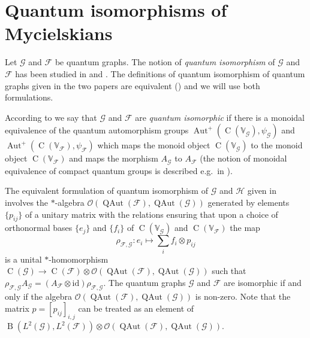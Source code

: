 \documentclass[11pt,reqno]{amsart}
\newcommand{\id}{\mathrm{id}}
\newcommand{\tens}{\otimes}
\DeclareMathOperator{\Aut}{Aut}
\DeclareMathOperator{\QAut}{QAut}
\DeclareMathOperator{\B}{B}
\DeclareMathOperator{\C}{C}
\begin{document}
\section{Quantum isomorphisms of Mycielskians}\label{sec:iso}

Let $\mathcal{G}$ and $\mathcal{F}$ be quantum graphs. The notion of \emph{quantum isomorphism} of $\mathcal{G}$ and $\mathcal{F}$ has been studied in \cite[Definition 4.4, Corollary 4.8]{Brannan_2019} and \cite[Definition 6.5, Theorem 6.6]{BEV}. The definitions of quantum isomorphism of quantum graphs given in the two papers are equivalent (\cite[Theorem 6.6]{BEV}) and we will use both formulations.

According to \cite[Definition 6.5]{BEV} we say that $\mathcal{G}$ and $\mathcal{F}$ are \emph{quantum isomorphic} if there is a monoidal equivalence of the quantum automorphism groups $\Aut^+(\C(\mathbb{V}_{\scriptscriptstyle\mathcal{G}}),\psi_{\scriptscriptstyle\mathcal{G}})$ and $\Aut^+(\C(\mathbb{V}_{\scriptscriptstyle\mathcal{F}}),\psi_{\scriptscriptstyle\mathcal{F}})$ which maps the monoid object $\C(\mathbb{V}_{\scriptscriptstyle\mathcal{G}})$ to the monoid object $\C(\mathbb{V}_{\scriptscriptstyle\mathcal{F}})$ and maps the morphism $A_{\scriptscriptstyle\mathcal{G}}$ to $A_{\scriptscriptstyle\mathcal{F}}$ (the notion of monoidal equivalence of compact quantum groups is described e.g.~in \cite{Rijdt}).

The equivalent formulation of quantum isomorphism of $\mathcal{G}$ and $\mathcal{H}$ given in \cite[Section 4]{Brannan_2019} involves the $*$-algebra $\mathcal{O}(\QAut(\mathcal{F}),\QAut(\mathcal{G}))$ generated by elements $\{p_{ij}\}$ of a unitary matrix with the relations ensuring that upon a choice of orthonormal bases $\{e_j\}$ and $\{f_i\}$ of $\C(\mathbb{V}_{\scriptscriptstyle\mathcal{G}})$ and $\C(\mathbb{V}_{\scriptscriptstyle\mathcal{F}})$ the map
\[
\rho_{\scriptscriptstyle\mathcal{F},\mathcal{G}}\colon e_i\longmapsto\sum_{i}f_i\tens p_{ij}
\]
is a unital $*$-homomorphism $\C(\mathcal{G})\to\C(\mathcal{F})\tens\mathcal{O}(\QAut(\mathcal{F}),\QAut(\mathcal{G}))$ such that $\rho_{\scriptscriptstyle\mathcal{F},\mathcal{G}} A_{\scriptscriptstyle\mathcal{G}}=(A_{\scriptscriptstyle\mathcal{F}}\tens\id)\rho_{\scriptscriptstyle\mathcal{F},\mathcal{G}}$. The quantum graphs $\mathcal{G}$ and $\mathcal{F}$ are isomorphic if and only if the algebra $\mathcal{O}(\QAut(\mathcal{F}),\QAut(\mathcal{G}))$ is non-zero. Note that the matrix $p=[p_{ij}]_{i,j}$ can be treated as an element of $\B(L^2(\mathcal{G}),L^2(\mathcal{F}))\tens\mathcal{O}(\QAut(\mathcal{F}),\QAut(\mathcal{G}))$.
\end{document}
